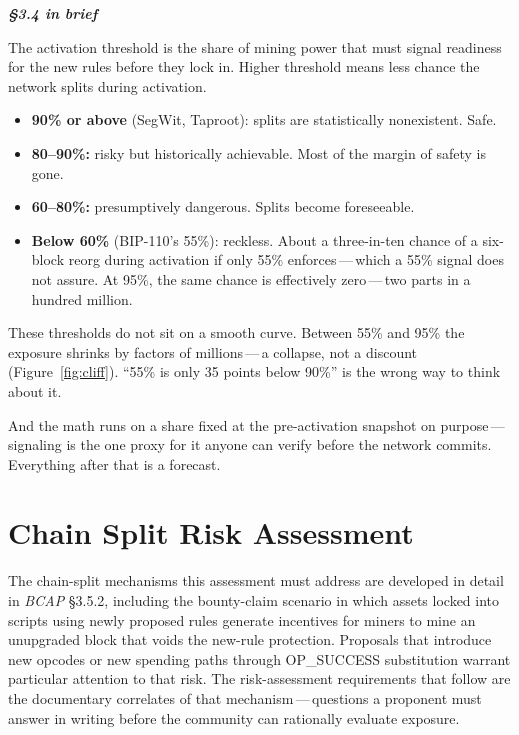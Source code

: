 \documentclass[11pt, twoside, openright]{book}
\newcommand{\sect}[1]{\S#1}
\newcommand{\peheader}[1]{{\itshape\bfseries #1}\par\vspace{4pt}}
\begin{document}
\needspace{3.2in}
\begin{plainenglish}
\peheader{\sect{3.4} in brief}

The activation threshold is the share of mining power that must signal readiness for the new rules before they lock in. Higher threshold means less chance the network splits during activation.

\begin{itemize}
  \item \textbf{90\% or above} (SegWit, Taproot): splits are statistically nonexistent. Safe.
  \item \textbf{80--90\%:} risky but historically achievable. Most of the margin of safety is gone.
  \item \textbf{60--80\%:} presumptively dangerous. Splits become foreseeable.
  \item \textbf{Below 60\%} (BIP-110's 55\%): reckless. About a three-in-ten chance of a six-block reorg during activation if only 55\% enforces\,---\,which a 55\% signal does not assure. At 95\%, the same chance is effectively zero\,---\,two parts in a hundred million.
\end{itemize}

These thresholds do not sit on a smooth curve. Between 55\% and 95\% the exposure shrinks by factors of millions\,---\,a collapse, not a discount (Figure~\ref{fig:cliff}). ``55\% is only 35 points below 90\%'' is the wrong way to think about it.

And the math runs on a share fixed at the pre-activation snapshot on purpose\,---\,signaling is the one proxy for it anyone can verify before the network commits. Everything after that is a forecast.
\end{plainenglish}

\section{Chain Split Risk Assessment}

The chain-split mechanisms this assessment must address are developed in detail in \textit{BCAP} \sect{3.5.2}, including the bounty-claim scenario in which assets locked into scripts using newly proposed rules generate incentives for miners to mine an unupgraded block that voids the new-rule protection. Proposals that introduce new opcodes or new spending paths through OP\_SUCCESS substitution warrant particular attention to that risk. The risk-assessment requirements that follow are the documentary correlates of that mechanism\,---\,questions a proponent must answer in writing before the community can rationally evaluate exposure.
\end{document}

